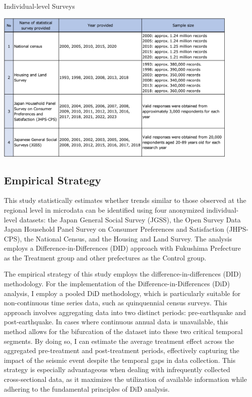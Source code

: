 \documentclass[12pt,halfline,a4paper]{ouparticle}
\begin{document}
\begin{table}[h]
    \centering
    \caption{Individual-level Surveys}
    \label{tab:annual_income}
    \includegraphics[width=0.9\textwidth]{Statistical surveys.png}  %
\end{table}

\subsection{Empirical Strategy}
\label{sec5.1}

This study statistically estimates whether trends similar to those observed at the regional level in microdata can be identified using four anonymized individual-level datasets: the Japan General Social Survey (JGSS), the Open Survey Data Japan Household Panel Survey on Consumer Preferences and Satisfaction (JHPS-CPS), the National Census, and the Housing and Land Survey. The analysis employs a Difference-in-Differences (DID) approach with Fukushima Prefecture as the Treatment group and other prefectures as the Control group.

The empirical strategy of this study employs the difference-in-differences (DID) methodology. For the implementation of the Difference-in-Differences (DiD) analysis, I employ a pooled DiD methodology, which is particularly suitable for non-continuous time series data, such as quinquennial census surveys. This approach involves aggregating data into two distinct periods: pre-earthquake and post-earthquake. In cases where continuous annual data is unavailable, this method allows for the bifurcation of the dataset into these two critical temporal segments. By doing so, I can estimate the average treatment effect across the aggregated pre-treatment and post-treatment periods, effectively capturing the impact of the seismic event despite the temporal gaps in data collection. This strategy is especially advantageous when dealing with infrequently collected cross-sectional data, as it maximizes the utilization of available information while adhering to the fundamental principles of DiD analysis.
\end{document}
